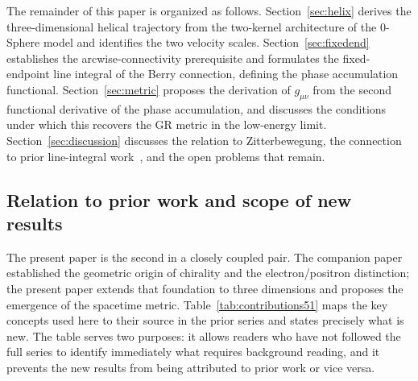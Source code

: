 \documentclass[%
 reprint, amsmath,amssymb, aps, prb, ]{revtex4-2}
\numberwithin{equation}{section}
\begin{document}
The remainder of this paper is organized as follows. Section~\ref{sec:helix} derives the three-dimensional helical trajectory from the two-kernel architecture of the 0-Sphere model and identifies the two velocity scales. Section~\ref{sec:fixedend} establishes the arcwise-connectivity prerequisite and formulates the fixed-endpoint line integral of the Berry connection, defining the phase accumulation functional. Section~\ref{sec:metric} proposes the derivation of $g_{\mu\nu}$ from the second functional derivative of the phase accumulation, and discusses the conditions under which this recovers the GR metric in the low-energy limit. Section~\ref{sec:discussion} discusses the relation to Zitterbewegung, the connection to prior line-integral work~\cite{hanamura29, hanamura30, hanamura31}, and the open problems that remain.

\subsection{Relation to prior work and scope of new results}
\label{subsec:prior_work}

The present paper is the second in a closely coupled pair. The companion paper~\cite{hanamura50} established the geometric origin of chirality and the electron/positron distinction; the present paper extends that foundation to three dimensions and proposes the emergence of the spacetime metric. Table~\ref{tab:contributions51} maps the key concepts used here to their source in the prior series and states precisely what is new. The table serves two purposes: it allows readers who have not followed the full series to identify immediately what requires background reading, and it prevents the new results from being attributed to prior work or vice versa.
\end{document}
